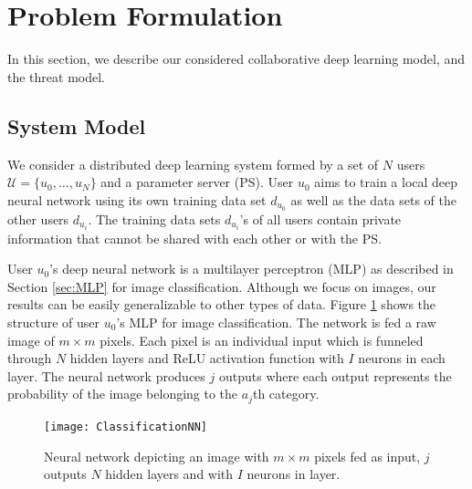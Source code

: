 \documentclass[conference]{IEEEtran}
\begin{document}
\section{Problem Formulation}
In this section, we describe our considered collaborative deep learning model, and the threat model. 

\subsection{System Model} \label{sec:systemModel}

We consider a distributed deep learning system formed by a set of $N$ users $\mathcal{U}= \{u_0, \dots,u_N\}$ and
a parameter server (PS). User $u_0$ aims to train a local deep neural network using its own training data set
$d_{u_0}$ as well as the data sets of the other users $d_{u_i}$. %
The training data sets $d_{u_i}$'s of all users contain private information that cannot be shared with each other or with the PS.  

User $u_0$'s deep neural network is a multilayer perceptron (MLP) as described in Section \ref{sec:MLP} for image classification.
Although we focus on images, our results can be easily generalizable to other types of data. 
Figure \ref{fig:ClassNN} shows the structure of user $u_0$'s MLP for image classification. The network is fed a raw image of  $m
\times m$ pixels. Each pixel is an individual input which is funneled through $N$ hidden layers and ReLU activation function with $I$
neurons in each layer. The neural network produces $j$ outputs where each output represents the probability of the image belonging to
the $a_j$th category. 
\begin{figure}[!h]
\texttt{[image: ClassificationNN]}
\caption{Neural network depicting an image with $m \times m$ pixels fed as input, $j$ outputs  $N$  hidden layers and with $I$ neurons in layer.}
\label{fig:ClassNN}
\end{figure}
\end{document}

